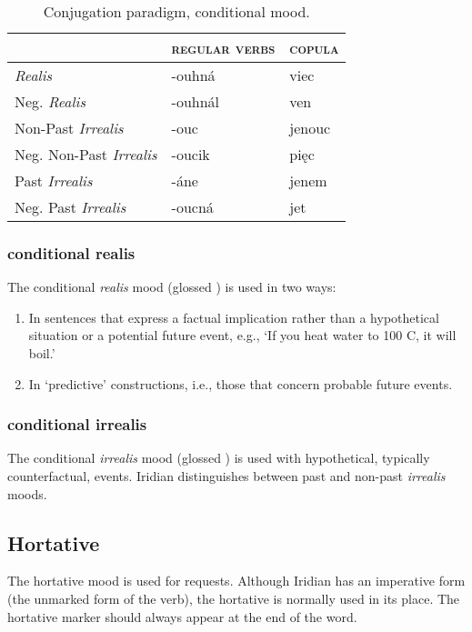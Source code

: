 \begin{table}[h!]
	\centering \small
	\caption{Conjugation paradigm, conditional mood.}
	\begin{tabu} to 0.9 \textwidth	{Y[1.3]MM}
		\toprule
		&{\scshape regular verbs} & {\scshape copula}\\
		\midrule
		
		\textit{Realis} &-ouhn\'a &viec\\
		Neg. \textit{Realis}&-ouhn\'al&ven\\
		
		Non-Past \textit{Irrealis} & -ouc & jenouc\\
		Neg. Non-Past \textit{Irrealis} & -oucik & pi\k{e}c\\
		
		Past \textit{Irrealis} & -\'ane & jenem\\
		Neg. Past \textit{Irrealis} & -oucn\'a & jet\\
		\bottomrule
	\end{tabu}
\end{table}

\subsubsection{conditional realis}

\par The conditional \textit{realis} mood (glossed ) is used in two ways:
\begin{enumerate}
	\item In sentences that express a factual implication rather than a hypothetical situation or a potential future event, e.g., `If you heat water to 100 C, it will boil.'
	\item In `predictive' constructions, i.e., those that concern probable future events.
\end{enumerate} 

\subsubsection{conditional irrealis}
The conditional \textit{irrealis} mood (glossed ) is used with hypothetical, typically counterfactual, events. Iridian distinguishes between past and non-past \textit{irrealis} moods.


\subsection{Hortative}
\par The hortative mood is used for requests. Although Iridian has an imperative form (the unmarked form of the verb), the hortative is normally used in its place. The hortative marker should always appear at the end of the word.

